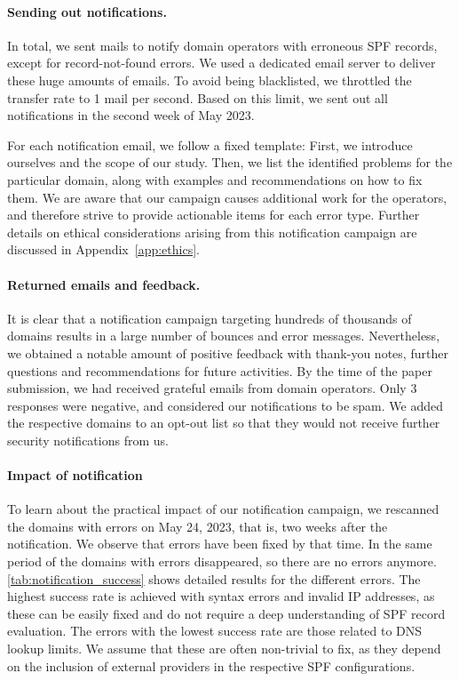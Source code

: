 \paragraph{Sending out notifications.}
In total, we sent \numprint{\NotificationsCount} mails to notify domain operators with erroneous SPF records, except for record-not-found errors.
We used a dedicated email server to deliver these huge amounts of emails.
To avoid being blacklisted, we throttled the transfer rate to 1 mail per second. Based on this limit, we sent out all notifications in the second week of May 2023.

For each notification email, we follow a fixed template: First, we introduce ourselves and the scope of our study. Then, we list the identified problems for the particular domain, along with examples and recommendations on how to fix them. We are aware that our campaign causes additional work for the operators, and therefore strive to provide actionable items for each error type. Further details on ethical considerations arising from this notification campaign are discussed in Appendix~\ref{app:ethics}.

\paragraph{Returned emails and feedback.}
It is clear that a notification campaign targeting hundreds of thousands of domains results in a large number of bounces and error messages. Nevertheless, we obtained a notable amount of positive feedback with thank-you notes, further questions and recommendations for future activities. By the time of the paper submission, we had received \numprint{\NotificationAnswersThx} grateful emails from domain operators. Only 3 responses were negative, and considered our notifications to be spam. We added the respective domains to an opt-out list so that they would not receive further security notifications from us.


\paragraph{Impact of notification}

To learn about the practical impact of our notification campaign, we rescanned the domains with errors on May 24, 2023, that is, two weeks after the notification.
We observe that \numprint{\SPFRescanResolvedErrors} errors have been fixed by that time. In the same period \numprint{\RescanEmptyDomains} of the domains with errors disappeared, so there are no errors anymore.
\autoref{tab:notification_success} shows detailed results for the different errors. The highest success rate is achieved with syntax errors and invalid IP addresses, as these can be easily fixed and do not require a deep understanding of SPF record evaluation. The errors with the lowest success rate are those related to DNS lookup limits. We assume that these are often non-trivial to fix, as they depend on the inclusion of external providers in the respective SPF configurations.

